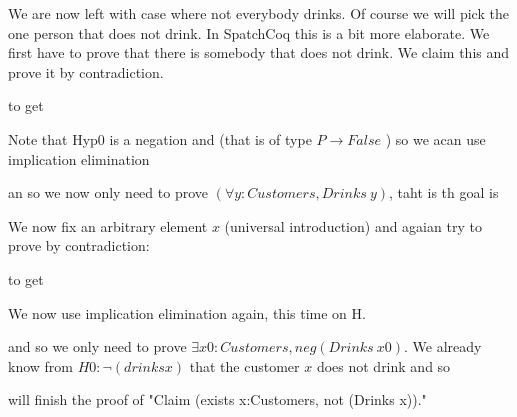 

We are now left with case where not everybody drinks. Of course we will pick the one person that does not drink. In SpatchCoq this is a bit more elaborate. We first have to prove that there is somebody that does not drink. We claim this and prove it by contradiction.


to get 


Note that Hyp0 is a negation and (that is of type $P\rightarrow False$ ) so we acan use implication elimination

an so we now only need to prove $(\forall y : Customers, Drinks\ y)$, taht is th goal is
 
 We now fix an arbitrary element $x$ (universal introduction) and agaian try to prove by contradiction:
 

to get 



We now use implication elimination again, this time on H.


and so we only need to prove $\exists x0 : Customers, neg (Drinks \ x0)$. We already know from $H0:\neg(drinks x)$ that the customer $x$ does not drink and so

will finish the proof of "Claim (exists x:Customers, not (Drinks x))."


